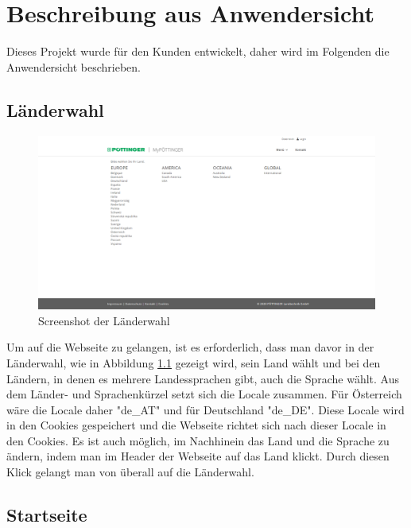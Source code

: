 \chapter{Beschreibung aus Anwendersicht} \label{anwendersicht}
Dieses Projekt wurde für den Kunden entwickelt, daher wird im Folgenden die Anwendersicht beschrieben.
\section{Länderwahl}
\begin{figure}[H]
	\centerline{
		\includegraphics[width=1\textwidth, frame]{./grafiken/erm_country_selection.png}
	}
	\vskip0pt
	\caption{Screenshot der Länderwahl} \label{fig:countrySelection}
\end{figure}
Um auf die Webseite zu gelangen, ist es erforderlich, dass man davor in der Länderwahl, wie in Abbildung \ref{fig:countrySelection} gezeigt wird, sein Land wählt und bei den Ländern, in denen es mehrere Landessprachen gibt, auch die Sprache wählt. Aus dem Länder- und Sprachenkürzel setzt sich die Locale zusammen. Für Österreich wäre die Locale daher "de\_AT" und für Deutschland "de\_DE". Diese Locale wird in den Cookies gespeichert und die Webseite richtet sich nach dieser Locale in den Cookies. Es ist auch möglich, im Nachhinein das Land und die Sprache zu ändern, indem man im Header der Webseite auf das Land klickt. Durch diesen Klick gelangt man von überall auf die Länderwahl.

\section{Startseite}
